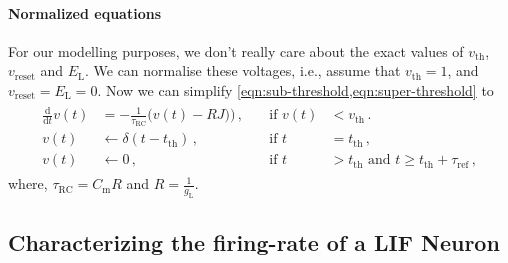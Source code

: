 \documentclass[10pt,letterpaper,oneside]{article}
\begin{document}
\paragraph{Normalized equations}
For our modelling purposes, we don't really care about the exact values of $v_\mathrm{th}$, $v_\mathrm{reset}$ and $E_\mathrm{L}$. We can normalise these voltages, i.e., assume that $v_\mathrm{th} = 1$, and $v_\mathrm{reset} = E_\mathrm{L} = 0$. Now we can simplify \cref{eqn:sub-threshold,eqn:super-threshold} to
\begin{align}
	\begin{aligned}
		\frac{\mathrm{d}}{\mathrm{d}t} v(t) &= -\frac{1}{\tau_\mathrm{RC}} \big( v(t) - RJ \big)
		\big) \,, \quad &\text{if } v(t) &< v_\mathrm{th}\,. \\
		v(t) &\gets \delta(t - t_\mathrm{th}) \,, &\text{if } t &= t_\mathrm{th} \,,\\
v(t) &\gets 0 \,, &\text{if } t &> t_\mathrm{th} \text{ and } t \geq t_\mathrm{th} + \tau_\mathrm{ref} \,,
	\end{aligned}
	\label{eqn:sub-threshold-normalised}
\end{align}
where, $\tau_\mathrm{RC} = C_\mathrm{m} R$ and $R = \frac{1}{g_\mathrm{L}}$.

\subsection{Characterizing the firing-rate of a LIF Neuron}
\end{document}
